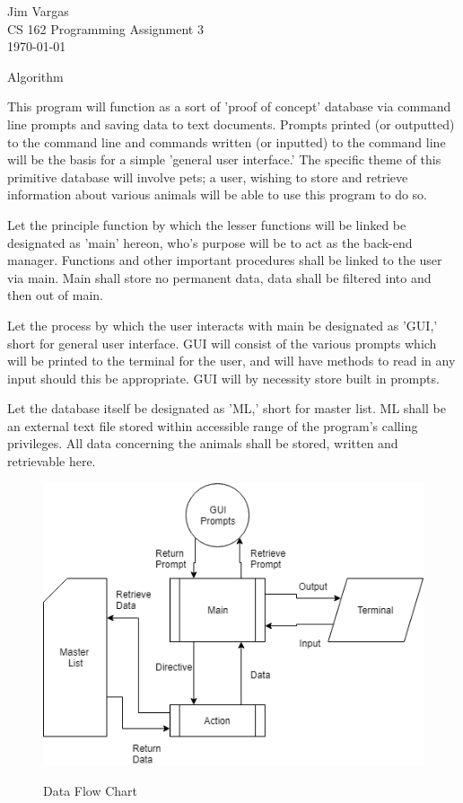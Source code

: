 \documentclass[12]{article}
\begin{document}
\noindent
\onehalfspacing
Jim Vargas \\
CS 162 Programming Assignment 3 \\
\today \\
\begin{center}
Algorithm
\end{center}

	This program will function as a sort of 'proof of concept' database via command line prompts and saving data to text documents. Prompts printed (or outputted) to the command line and commands written (or inputted) to the command line will be the basis for a simple 'general user interface.' The specific theme of this primitive database will involve pets; a user, wishing to store and retrieve information about various animals will be able to use this program to do so.
	
	Let the principle function by which the lesser functions will be linked be designated as 'main' hereon, who's purpose will be to act as the back-end manager. Functions and other important procedures shall be linked to the user via main. Main shall store no permanent data, data shall be filtered into and then out of main.
		
	Let the process by which the user interacts with main be designated as 'GUI,' short for general user interface. GUI will consist of the various prompts which will be printed to the terminal for the user, and will have methods to read in any input should this be appropriate. GUI will by necessity store built in prompts.
	
	Let the database itself be designated as 'ML,' short for master list. ML shall be an external text file stored within accessible range of the program's calling privileges. All data concerning the animals shall be stored, written and retrievable here.
	
\begin{figure}[h]
\centering
\includegraphics[scale=.8]{data_chart.png}\\
\caption{Data Flow Chart} 
\label{fig:fig1}
\end{figure}
\end{document}
